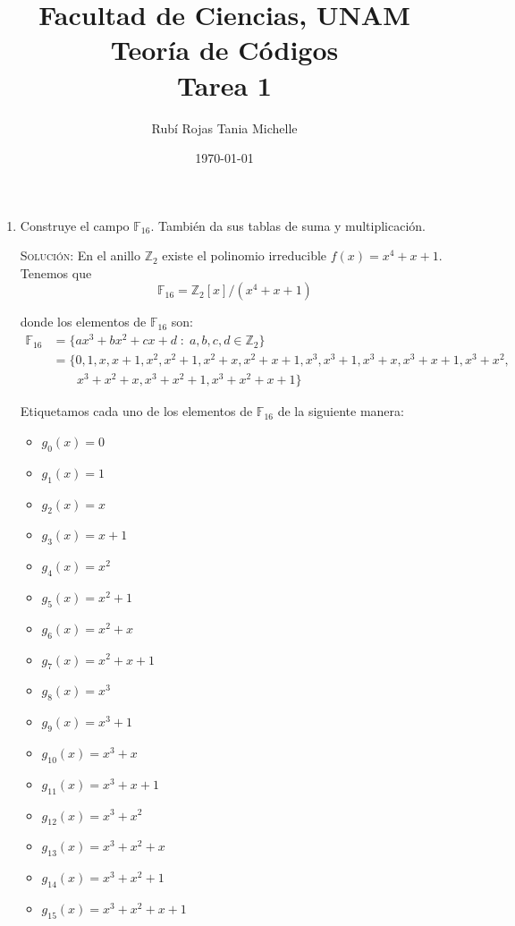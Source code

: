 \documentclass[letterpaper,10pt]{article}
\title{Facultad de Ciencias, UNAM \\ Teoría de Códigos \\ Tarea 1}
\author{Rubí Rojas Tania Michelle}
\date{\today}
\begin{document}
\maketitle

\begin{enumerate}
    \item Construye el campo $\mathbb{F}_{16}$. También da sus tablas de suma y 
    multiplicación.
    
    \textsc{Solución:} En el anillo $\mathbb{Z}_{2}$ existe el polinomio 
    irreducible $f(x) = x^{4}+x+1$. Tenemos que 
    \begin{equation}
        \mathbb{F}_{16} = \mathbb{Z}_{2}[x]/(x^{4}+x+1)
    \end{equation}
    
    donde los elementos de $\mathbb{F}_{16}$ son:
    \begin{align*}
        \mathbb{F}_{16} 
        &= \{ax^{3} + bx^{2} + cx + d \; : \; a,b,c,d \in \mathbb{Z}_{2}\} \\
        &= \{0, 1, x, x + 1, x^2, x^2 + 1, x^2 + x, x^2 + x + 1, x^3, 
             x^3 + 1, x^3 + x, x^3 + x + 1, x^3 + x^2, \\ 
        &\; \; \; \; \; \; \; x^3 + x^2 + x, x^3 + x^2 + 1, x^3 + x^2 + x + 1\}
    \end{align*}
    
    Etiquetamos cada uno de los elementos de $\mathbb{F}_{16}$ de la siguiente 
    manera:
    \begin{multicols}{3}
        \begin{itemize}
            \item $g_{0}(x) = 0$
            \item $g_{1}(x) = 1$
            \item $g_{2}(x) = x$
            \item $g_{3}(x) = x+1$
            \item $g_{4}(x) = x^{2}$
            \item $g_{5}(x) = x^{2}+1$
            \item $g_{6}(x) = x^{2}+x$
            \item $g_{7}(x) = x^{2}+x+1$
            \item $g_{8}(x) = x^{3}$
            \item $g_{9}(x) = x^{3}+1$
            \item $g_{10}(x) = x^{3}+x$
            \item $g_{11}(x) = x^{3}+x+1$
            \item $g_{12}(x) = x^{3}+x^{2}$
            \item $g_{13}(x) = x^{3}+x^{2}+x$
            \item $g_{14}(x) = x^{3}+x^{2}+1$
            \item $g_{15}(x) = x^{3}+x^{2}+x+1$
        \end{itemize}
    \end{multicols}


\end{enumerate}
\end{document}
